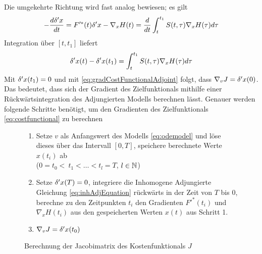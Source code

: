 Die umgekehrte Richtung wird fast analog bewiesen; es gilt
\begin{equation*}
 -\frac{d\delta 'x}{dt} = F'^*(t) \delta'x - \nabla_x H(t)
			 = \frac{d}{dt} \int_t^{t_1} S(t,\tau) \nabla_x H(\tau) d\tau
\end{equation*}
Integration über $[t,t_1]$ liefert
\[
 \delta 'x(t) -  \delta 'x(t_1)  = \int_t^{t_1} S(t,\tau) \nabla_x H(\tau) d\tau
\]
Mit $ \delta 'x(t_1) = 0$ und mit \eqref{eq:gradCostFunctionalAdjoint} folgt, dass $\nabla_v J = \delta'x(0)$. Das bedeutet, dass sich der Gradient des Zielfunktionals mithilfe einer Rückwärtsintegration des Adjungierten Modells berechnen lässt.
Genauer werden folgende Schritte benötigt, um den Gradienten des Zielfunktionals \eqref{eq:costfunctional} zu berechnen
\begin{figure}
 \begin{enumerate}
 \item Setze $v$ als Anfangswert des Modells \eqref{eq:odemodel} und löse dieses über das Intervall $[0,T]$, speichere berechnete Werte $x(t_i)$ ab\\
 ($0= t_0<~ t_1<\ldots<t_l=T$, $l\in \mathbb{N}$)
 \item Setze $\delta 'x(T) = 0$, integriere die Inhomogene Adjungierte Gleichung \eqref{eq:inhAdjEquation} rückwärts in der Zeit von $T$ bis $0$, berechne zu den Zeitpunkten $t_i$ den Gradienten $F'^*(t_i)$ und $\nabla_x H(t_i)$ aus den gespeicherten Werten $x(t)$ aus Schritt 1.
 \item $\nabla_v J = \delta 'x(t_0)$
\end{enumerate}
 \caption{Berechnung der Jacobimatrix des Kostenfunktionals $J$}
\end{figure}

% 

